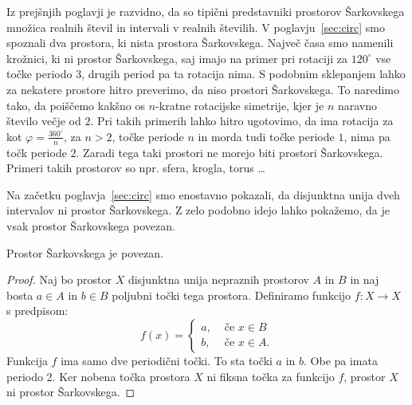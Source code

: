 \documentclass[../TG_magistrsko_delo_sections.tex]{subfiles}
\begin{document}
Iz prejšnjih poglavji je razvidno, da so tipični predstavniki prostorov Šarkovskega množica realnih števil in intervali v realnih številih. V poglavju~\ref{sec:circ} smo spoznali dva prostora, ki nista prostora Šarkovskega. Največ časa smo namenili krožnici, ki ni prostor Šarkovskega, saj imajo na primer pri rotaciji za $120^\circ$ vse točke periodo $3$, drugih period pa ta rotacija nima.
S podobnim sklepanjem lahko za nekatere prostore hitro preverimo, da niso prostori Šarkovskega. To naredimo tako, da poiščemo kakšno os $n$-kratne rotacijske simetrije, kjer je $n$ naravno število večje od $2$. Pri takih primerih lahko hitro ugotovimo, da ima rotacija za kot $\varphi = \frac{360^\circ}{n}$, za $n>2$, točke periode $n$ in morda tudi točke periode $1$, nima pa točk periode $2$. Zaradi tega taki prostori ne morejo biti prostori Šarkovskega. Primeri takih prostorov so npr. sfera, krogla, torus \dots 


Na začetku poglavja~\ref{sec:circ} smo enostavno pokazali, da disjunktna unija dveh intervalov ni prostor Šarkovskega. Z zelo podobno idejo lahko pokažemo, da je vsak prostor Šarkovskega povezan.


\begin{trditev}
Prostor Šarkovskega je povezan.
\end{trditev}
\begin{proof}
Naj bo prostor $X$ disjunktna unija nepraznih prostorov $A$ in $B$ in naj bosta $a \in A$ in $b \in B$ poljubni točki tega prostora. Definiramo funkcijo $f:X \to X$ s predpisom:
\[ f(x) = \begin{cases}
  a, & \mbox{ če $x \in B $}\\
  b ,& \mbox{ če $x \in A$.}
  \end{cases}
  \]
Funkcija $f$ ima samo dve periodični točki. To sta točki $a$ in $b$. Obe pa imata periodo 2. Ker nobena točka prostora $X$ ni fiksna točka za funkcijo $f$, prostor $X$ ni prostor Šarkovskega.
\end{proof}
\end{document}
